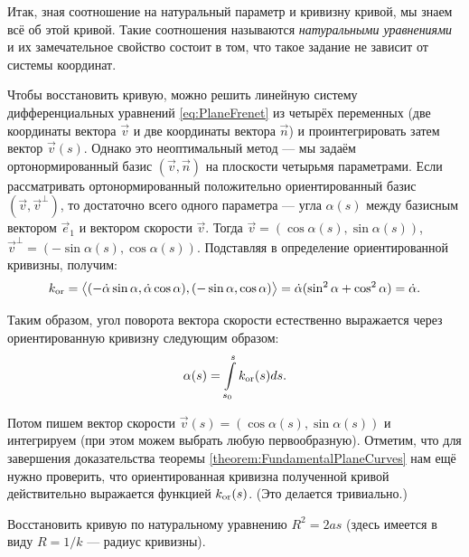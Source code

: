 Итак, зная соотношение на натуральный параметр и кривизну кривой, мы знаем всё об этой кривой. Такие соотношения называются \textit{натуральными уравнениями} и их замечательное свойство состоит в том, что такое задание не зависит от системы координат.

Чтобы восстановить кривую, можно решить линейную систему дифференциальных уравнений \eqref{eq:PlaneFrenet} из четырёх переменных (две координаты вектора $\vec{v}$ и две координаты вектора $\vec{n}$) и проинтегрировать затем вектор $\vec{v}(s)$. Однако это неоптимальный метод --- мы задаём ортонормированный базис $(\vec{v}, \vec{n})$ на плоскости четырьмя параметрами. Если рассматривать ортонормированный положительно ориентированный базис $(\vec{v}, \vec{v}^{\perp})$, то достаточно всего одного параметра --- угла $\alpha(s)$ между базисным вектором $\vec{e}_1$ и вектором скорости $\vec{v}$. Тогда $\vec{v} = (\cos\alpha(s), \sin\alpha(s))$, $\vec{v}^\perp = (-\sin\alpha(s), \cos\alpha(s))$. Подставляя в определение ориентированной кривизны, получим:
\[
	k_{\mathrm{or}} = \big\langle(-\dot{\alpha}\sin\alpha, \dot{\alpha}\cos\alpha), (-\sin\alpha, \cos\alpha)\big\rangle = \dot{\alpha}(\sin^2\alpha + \cos^2\alpha) = \dot{\alpha}.
\]

Таким образом, угол поворота вектора скорости естественно выражается через ориентированную кривизну следующим образом:
\begin{equation} \label{eq:AngleByCurvature}
	\alpha(s) = \int\limits_{s_0}^sk_{\mathrm{or}}(s)ds.
\end{equation}

Потом пишем вектор скорости $\vec{v}(s) = (\cos\alpha(s), \sin\alpha(s))$ и интегрируем (при этом можем выбрать любую первообразную). Отметим, что для завершения доказательства теоремы \ref{theorem:FundamentalPlaneCurves} нам ещё нужно проверить, что ориентированная кривизна полученной кривой действительно выражается функцией $k_{\mathrm{or}}(s)$. (Это делается тривиально.)

\begin{problem} \label{problem:NaturalEquation}
	Восстановить кривую по натуральному уравнению $R^2 = 2as$ (здесь имеется в виду $R = 1 / k$ --- радиус кривизны).
\end{problem}

